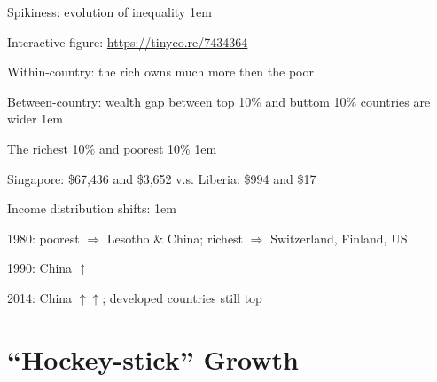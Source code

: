 \documentclass[11pt,aspectratio=43,usenames,dvipsnames]{beamer}
\newcommand{\blue}[1]{\textcolor{blue}{#1}}
\let\olditemize=\itemize
\let\endolditemize=\enditemize
\renewenvironment{itemize}{\olditemize \itemsep1em}{\endolditemize}
\let\oldenumerate=\enumerate
\let\endoldenumerate=\endenumerate
\renewenvironment{enumerate}{\oldenumerate \itemsep1em}{ \endoldenumerate}
\theoremstyle{definition}
\begin{document}
\begin{frame}{Spikiness: evolution of inequality}
\label{slide:Spikiness__evolution_of_inequality}
    \begin{itemize}
        \item Interactive figure: \blue{\url{https://tinyco.re/7434364}}
        \item Within-country: the rich owns much more then the poor
        \item Between-country: wealth gap between top 10\% and buttom 10\% countries are wider
        \begin{enumerate}
            \item The richest 10\% and poorest 10\%
            \begin{itemize}
                \item Singapore: \$67,436 and \$3,652 v.s. Liberia: \$994 and \$17
            \end{itemize}
            \item Income distribution shifts:
            \begin{itemize}
                \item 1980: poorest $ \Rightarrow  $ Lesotho \& China; richest $ \Rightarrow  $ Switzerland, Finland, US
                \item 1990: China $ \uparrow  $
                \item 2014: China $ \uparrow \uparrow  $; developed countries still top
            \end{itemize}
        \end{enumerate}
    \end{itemize}
\end{frame}

\section[Growth]{``Hockey-stick'' Growth}
\label{sec:__Hockey_stick___Growth}
\end{document}
